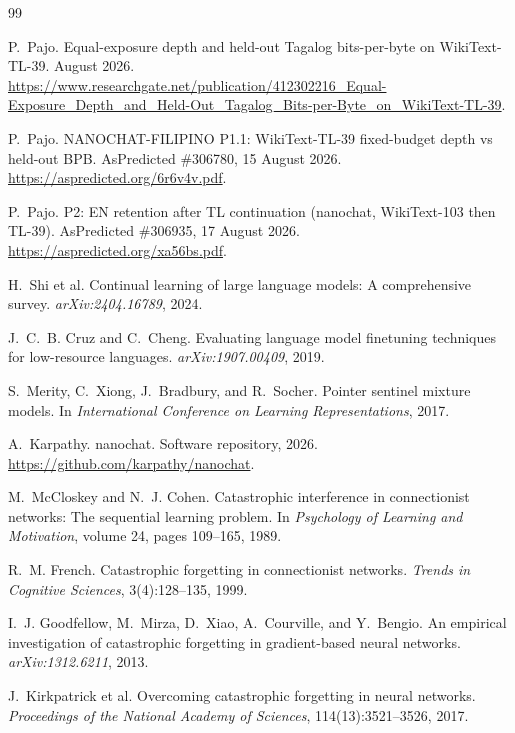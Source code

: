 \documentclass[11pt,a4paper]{article}
\begin{document}
\begin{thebibliography}{99}

P.~Pajo.
\newblock Equal-exposure depth and held-out Tagalog bits-per-byte on WikiText-TL-39.
 August 2026.
\newblock \url{https://www.researchgate.net/publication/412302216_Equal-Exposure_Depth_and_Held-Out_Tagalog_Bits-per-Byte_on_WikiText-TL-39}.

P.~Pajo.
\newblock NANOCHAT-FILIPINO P1.1: WikiText-TL-39 fixed-budget depth vs held-out BPB.
\newblock AsPredicted \#306780, 15 August 2026.
\newblock \url{https://aspredicted.org/6r6v4v.pdf}.

P.~Pajo.
\newblock P2: EN retention after TL continuation (nanochat, WikiText-103 then TL-39).
\newblock AsPredicted \#306935, 17 August 2026.
\newblock \url{https://aspredicted.org/xa56bs.pdf}.

H.~Shi et al.
\newblock Continual learning of large language models: A comprehensive survey.
\newblock \emph{arXiv:2404.16789}, 2024.

J.~C.~B. Cruz and C.~Cheng.
\newblock Evaluating language model finetuning techniques for low-resource languages.
\newblock \emph{arXiv:1907.00409}, 2019.

S.~Merity, C.~Xiong, J.~Bradbury, and R.~Socher.
\newblock Pointer sentinel mixture models.
\newblock In \emph{International Conference on Learning Representations}, 2017.

A.~Karpathy.
\newblock nanochat.
\newblock Software repository, 2026.
\newblock \url{https://github.com/karpathy/nanochat}.

M.~McCloskey and N.~J. Cohen.
\newblock Catastrophic interference in connectionist networks: The sequential learning problem.
\newblock In \emph{Psychology of Learning and Motivation}, volume 24, pages 109--165, 1989.

R.~M. French.
\newblock Catastrophic forgetting in connectionist networks.
\newblock \emph{Trends in Cognitive Sciences}, 3(4):128--135, 1999.

I.~J. Goodfellow, M.~Mirza, D.~Xiao, A.~Courville, and Y.~Bengio.
\newblock An empirical investigation of catastrophic forgetting in gradient-based neural networks.
\newblock \emph{arXiv:1312.6211}, 2013.

J.~Kirkpatrick et al.
\newblock Overcoming catastrophic forgetting in neural networks.
\newblock \emph{Proceedings of the National Academy of Sciences}, 114(13):3521--3526, 2017.


\end{thebibliography}
\end{document}
